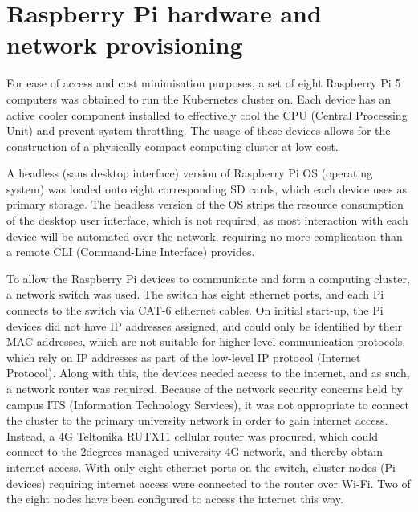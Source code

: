 \section{Raspberry Pi hardware and network provisioning}

For ease of access and cost minimisation purposes, a set of eight Raspberry Pi 5 computers was obtained to run the Kubernetes cluster on. Each device has an active cooler component installed to effectively cool the CPU (Central Processing Unit) and prevent system throttling. The usage of these devices allows for the construction of a physically compact computing cluster at low cost.

A headless (sans desktop interface) version of Raspberry Pi OS (operating system) was loaded onto eight corresponding SD cards, which each device uses as primary storage. The headless version of the OS strips the resource consumption of the desktop user interface, which is not required, as most interaction with each device will be automated over the network, requiring no more complication than a remote CLI (Command-Line Interface) provides.

To allow the Raspberry Pi devices to communicate and form a computing cluster, a network switch was used. The switch has eight ethernet ports, and each Pi connects to the switch via CAT-6 ethernet cables. On initial start-up, the Pi devices did not have IP addresses assigned, and could only be identified by their MAC addresses, which are not suitable for higher-level communication protocols, which rely on IP addresses as part of the low-level IP protocol (Internet Protocol). Along with this, the devices needed access to the internet, and as such, a network router was required. Because of the network security concerns held by campus ITS (Information Technology Services), it was not appropriate to connect the cluster to the primary university network in order to gain internet access. Instead, a 4G Teltonika RUTX11 cellular router was procured, which could connect to the 2degrees-managed university 4G network, and thereby obtain internet access. With only eight ethernet ports on the switch, cluster nodes (Pi devices) requiring internet access were connected to the router over Wi-Fi. Two of the eight nodes have been configured to access the internet this way.


